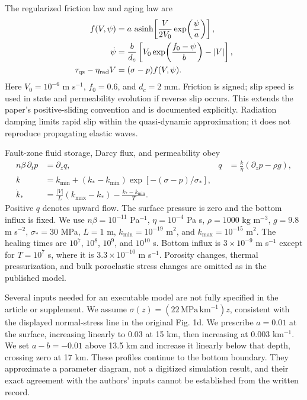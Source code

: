 \documentclass[11pt]{article}
\begin{document}
The regularized friction law and aging law are
\begin{align}
 f(V,\psi)&=a\,\operatorname{asinh}\!\left[\frac{V}{2V_0}
                     \exp\!\left(\frac{\psi}{a}\right)\right],\\
 \dot\psi&=\frac{b}{d_c}\left[V_0\exp\!\left(\frac{f_0-\psi}{b}\right)-|V|\right],\\
 \tau_{\rm qs}-\eta_{\rm rad}V&=(\sigma-p)f(V,\psi).
\end{align}
Here $V_0=10^{-6}$ m s$^{-1}$, $f_0=0.6$, and $d_c=2$ mm. Friction is signed;
slip speed is used in state and permeability evolution if reverse slip occurs.
This extends the paper's positive-sliding convention and is documented explicitly.
Radiation damping limits rapid slip within the quasi-dynamic approximation;
it does not reproduce propagating elastic waves.

Fault-zone fluid storage, Darcy flux, and permeability obey
\begin{align}
 n\beta\,\partial_t p&=\partial_z q,
 &q&=\frac{k}{\eta}\left(\partial_zp-\rho g\right),\\
 k&=k_{\min}+(k_*-k_{\min})\exp[-(\sigma-p)/\sigma_*],\\
 \dot k_*&=\frac{|V|}{L}(k_{\max}-k_*)-\frac{k_*-k_{\min}}{T}.
\end{align}
Positive $q$ denotes upward flow. The surface pressure is zero and the bottom
influx is fixed. We use $n\beta=10^{-11}$ Pa$^{-1}$, $\eta=10^{-4}$ Pa s,
$\rho=1000$ kg m$^{-3}$, $g=9.8$ m s$^{-2}$, $\sigma_*=30$ MPa, $L=1$ m,
$k_{\min}=10^{-19}$ m$^2$, and $k_{\max}=10^{-15}$ m$^2$.
The healing times are $10^7$, $10^8$, $10^9$, and $10^{10}$ s. Bottom influx is
$3\times10^{-9}$ m s$^{-1}$ except for $T=10^7$ s, where it is
$3.3\times10^{-10}$ m s$^{-1}$. Porosity changes, thermal pressurization, and
bulk poroelastic stress changes are omitted as in the published model.

Several inputs needed for an executable model are not fully specified in the
article or supplement. We assume $\sigma(z)=(22\,\mathrm{MPa}\,\mathrm{km}^{-1})z$,
consistent with the displayed normal-stress line in the original Fig. 1d.
We prescribe $a=0.01$ at the surface, increasing linearly to 0.03 at 15 km,
then increasing at $0.003$ km$^{-1}$. We set $a-b=-0.01$ above 13.5 km and
increase it linearly below that depth, crossing zero at 17 km. These profiles
continue to the bottom boundary. They approximate a parameter diagram, not a
digitized simulation result, and their exact agreement with the authors' inputs
cannot be established from the written record.
\end{document}
